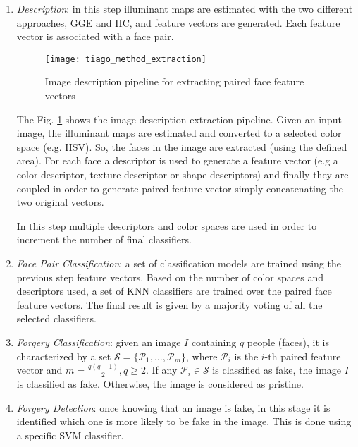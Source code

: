 \begin{enumerate}
\item \emph{Description}: in this step illuminant maps are estimated with the two different approaches, GGE and IIC, and feature vectors are generated. Each feature vector is associated with a face pair.
\begin{figure}[h!]
  \centering
    \texttt{[image: tiago\_method\_extraction]}
    \caption{Image description pipeline for extracting paired face feature vectors}
    \label{fig:tiago_method_extraction}
\end{figure}

The Fig. \ref{fig:tiago_method_extraction} shows the image description extraction pipeline. Given an input image, the illuminant maps are estimated and converted to a selected color space (e.g. HSV). So, the faces in the image are extracted (using the defined area). For each face a descriptor is used to generate a feature vector (e.g a color descriptor, texture descriptor or shape descriptors) and finally they are coupled in order to generate paired feature vector simply concatenating the two original vectors.

In this step multiple descriptors and color spaces are used in order to increment the number of final classifiers.

\item \emph{Face Pair Classification}: a set of classification models are trained using the previous step feature vectors. Based on the number of color spaces and descriptors used, a set of KNN classifiers are trained over the paired face feature vectors. The final result is given by a majority voting of all the selected classifiers.

\item \emph{Forgery Classification}: given an image $I$ containing $q$ people (faces), it is characterized by a set $\mathcal{S} = \{\mathcal{P}_1, \ldots, \mathcal{P}_m \}$, where $\mathcal{P}_i$ is the $i$-th paired feature vector and $m = \frac{q(q-1)}{2}, q \geq 2$. If any $\mathcal{P}_i \in \mathcal{S}$ is classified as fake, the image $I$ is classified as fake. Otherwise, the image is considered as pristine.

\item \emph{Forgery Detection}: once knowing that an image is fake, in this stage it is identified which one is more likely to be fake in the image. This is done using a specific SVM classifier.   
\end{enumerate}

